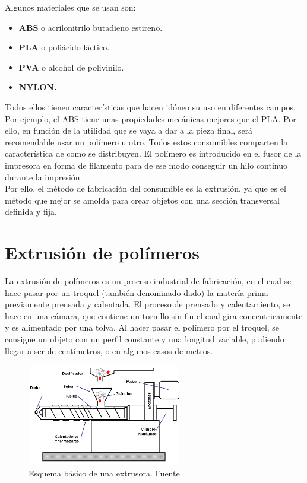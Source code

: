 Algunos materiales que se usan son:
\begin{itemize}
    \item \textbf{ABS} o acrilonitrilo butadieno estireno.
    \item \textbf{PLA} o poliácido láctico.
    \item \textbf{PVA} o alcohol de polivinilo.
    \item \textbf{NYLON.}
\end{itemize}

Todos ellos tienen características que hacen idóneo su uso en diferentes campos. Por ejemplo, el ABS tiene unas propiedades mecánicas mejores que el PLA. Por ello, en función de la utilidad que se vaya a dar a la pieza final, será recomendable usar un polímero u otro. Todos estos consumibles comparten la característica de como se distribuyen. El polímero es introducido en el fusor de la impresora en forma de filamento para de ese modo conseguir un hilo continuo durante la impresión.\\

Por ello, el método de fabricación del consumible es la extrusión, ya que es el método que mejor se amolda para crear objetos con una sección transversal definida y fija.

\section{Extrusión de polímeros}
\label{arte_extrusion}
La extrusión de polímeros es un proceso industrial de fabricación, en el cual se hace pasar por un troquel (también denominado dado) la matería prima previamente prensada y calentada. El proceso de prensado y calentamiento, se hace en una cámara, que contiene un tornillo sin fin el cual gira concentricamente y es alimentado por una tolva. Al hacer pasar el polímero por el troquel, se consigue un objeto con un perfil constante y una longitud variable, pudiendo llegar a ser de centímetros, o en algunos casos de metros.

\begin{figure}[H]
        \centering
        \includegraphics[width=0.6\textwidth]{images/extrusor.png}
        \caption{Esquema básico de una extrusora. Fuente \cite{disenoextrusor}}
        \label{fig:estado_extrusora}
\end{figure}

